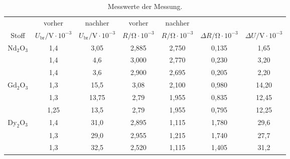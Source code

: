 \begin{table}
  \centering
  \caption{Messwerte der Messung.}
  \label{tab:mess}
  \begin{tabular}{c c c c c c c}
    &   vorher & nachher & vorher & nachher & \\
  Stoff &  $U_\mathrm{br}/\si{\volt}\cdot 10^{-3}$ & $U_\mathrm{br}/\si{\volt}\cdot 10^{-3}$  & $R/\si{\ohm}\cdot10^{-3}$  & $R/\si{\ohm}\cdot10^{-3}$  & $\Delta R/\si{\ohm}\cdot10^{-3}$ & $\Delta U/\si{\volt}\cdot10^{-3}$ \\
   \midrule
  $\mathrm{Nd_2O_3}$ & 1,4  &  3,05 & 2,885 & 2,750 & 0,135 & 1,65  \\
                     & 1,4  &  4,6  & 3,000 & 2,770 & 0,230 & 3,20 \\
                     & 1,4  &  3,6  & 2,900 & 2,695 & 0,205 & 2,20 \\
   \midrule
   $\mathrm{Gd_2O_3}$ & 1,3  & 15,5  & 3,08 & 2,100 & 0,980 & 14,20 \\
                      & 1,3  & 13,75 & 2,79 & 1,955 & 0,835 & 12,45 \\
                      & 1,25 & 13,5  & 2,79 & 1,955 & 0,795 & 12,25 \\
   \midrule
  $\mathrm{Dy_2O_3}$ & 1,4 & 31,0 & 2,895 & 1,115 & 1,780 & 29,6 \\
                     & 1,3 & 29,0 & 2,955 & 1,215 & 1,740 & 27,7 \\
                     & 1,3 & 32,5 & 2,520 & 1,115 & 1,405 & 31,2 \\
   \bottomrule
  \end{tabular}
\end{table}
\FloatBarrier
